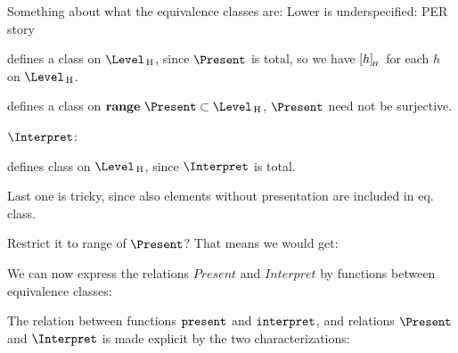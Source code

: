 \bc
\textdownarrow\textdownarrow\textdownarrow\textdownarrow

Something about what the equivalence classes are: Lower is underspecified: 
PER story


defines a class on $\Level\H$, since $\Present$ is total, so we have $[{h}]_{{\!_{H}}}$ for each $h$ on $\Level\H$.

defines a class on ${\bf range}~\Present \subset \Level\H$, $\Present$ need not be surjective.

$\Interpret$:


defines class on $\Level\H$, since $\Interpret$ is total.

Last one is tricky, since also elements without presentation are included in eq. class.

Restrict it to range of $\Present$?
That means we would get:


\textuparrow\textuparrow\textuparrow\textuparrow
\ec

We can now express the relations $Present$ and $Interpret$ by functions between equivalence classes:



%

The relation between functions ${\tt present}$ and ${\tt interpret}$, and relations $\Present$ and $\Interpret$ is made explicit by the two characterizations: 


